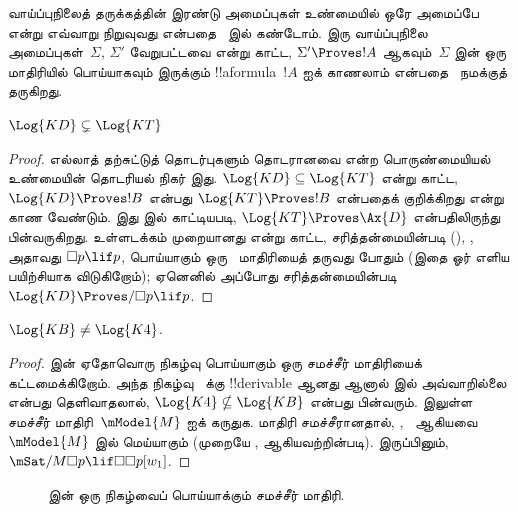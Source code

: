 \documentclass[../../../include/open-logic-section]{subfiles}
\begin{document}


வாய்ப்புநிலைத் தருக்கத்தின் இரண்டு அமைப்புகள் உண்மையில் ஒரே அமைப்பே என்று
எவ்வாறு நிறுவுவது என்பதை~ இல் கண்டோம்.
இரு வாய்ப்புநிலை அமைப்புகள்~$\Sigma$, $\Sigma'$ வேறுபட்டவை என்று காட்ட,
$\Sigma' \Proves !A$ ஆகவும்~$\Sigma$ இன் ஒரு மாதிரியில் பொய்யாகவும்
இருக்கும் !!a{formula}~$!A$ ஐக் காணலாம் என்பதை~
நமக்குத் தருகிறது.

\begin{prop}
  $\Log{KD} \subsetneq \Log{KT}$
\end{prop}

\begin{proof} எல்லாத் தற்சுட்டுத் தொடர்புகளும் தொடரானவை என்ற பொருண்மையியல்
  உண்மையின் தொடரியல் நிகர் இது. $\Log{KD} \subseteq \Log{KT}$ என்று
  காட்ட, $\Log{KD} \Proves !B$ என்பது $\Log{KT} \Proves !B$ என்பதைக்
  குறிக்கிறது என்று காண வேண்டும். இது
   இல் காட்டியபடி,
  $\Log{KT} \Proves \Ax{D}$ என்பதிலிருந்து பின்வருகிறது.
  உள்ளடக்கம் முறையானது என்று காட்ட, சரித்தன்மையின்படி
  (), , அதாவது $\Box p \lif p$, பொய்யாகும்
  ஒரு~ மாதிரியைத் தருவது போதும் (இதை ஓர் எளிய பயிற்சியாக
  விடுகிறோம்); ஏனெனில் அப்போது சரித்தன்மையின்படி $\Log{KD}
  \Proves/ \Box p \lif p$.
\end{proof}

\begin{prop}
  $\Log{KB} \neq \Log{K4}$.
\end{prop}

\begin{proof}
   இன் ஏதோவொரு நிகழ்வு பொய்யாகும் ஒரு சமச்சீர் மாதிரியைக்
  கட்டமைக்கிறோம். அந்த நிகழ்வு~ க்கு !!{derivable} ஆனது ஆனால்
   இல் அவ்வாறில்லை என்பது தெளிவாதலால்,
  $\Log{K4} \nsubseteq \Log{KB}$ என்பது பின்வரும்.
   இலுள்ள சமச்சீர் மாதிரி~$\mModel{M}$ ஐக் கருதுக.
  மாதிரி சமச்சீரானதால், ,~ ஆகியவை~$\mModel{M}$ இல் மெய்யாகும்
  (முறையே ,
   ஆகியவற்றின்படி). இருப்பினும்,
  $\mSat/{M}{\Box p \lif \Box\Box p}[w_1]$.
\end{proof}

\begin{figure}[htpb]
  \centering
  \caption{ இன் ஒரு நிகழ்வைப் பொய்யாக்கும் சமச்சீர் மாதிரி.}
\end{figure}
\end{document}
